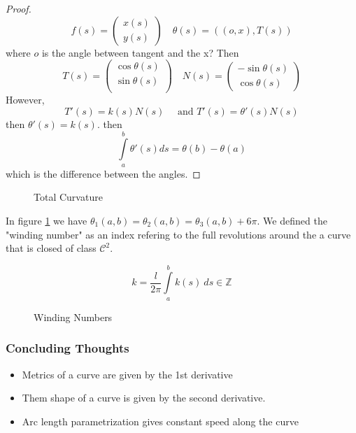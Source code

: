 \begin{proof}
    \[
        f(s) = \begin{pmatrix*}
            x(s)  \\
            y(s)  
        \end{pmatrix*}
        \quad \theta (s) = \left( (o,x) , T(s) \right) 
    \]
    where $ o  $ is the angle between tangent and the x? 
    Then 
    \[
        T(s) = \begin{pmatrix*}
            \cos \theta (s)   \\
            \sin \theta (s)   \\
        \end{pmatrix*}
        \quad 
        N(s) = 
        \begin{pmatrix*}
            -\sin \theta (s)  \\
            \cos \theta (s)   
        \end{pmatrix*}
        
    \]
    However, 
    \[
        T'(s) = k(s) N(s) \quad \text{ and } T'(s) = \theta '(s) N(s) 
    \]
    then 
    $ \theta '(s) = k(s)  $. 
    then 
    \[
        \int\limits_{a}^{b} \theta '(s) ds = \theta(b) - \theta(a) 
    \]
    which is the difference between the angles. 
\end{proof}

\begin{figure}[ht]
    \centering
    \caption{Total Curvature}
    \label{fig:total-curvature}
\end{figure}

In figure \ref{fig:total-curvature} we have $ \theta_1\left( a,b\right) = \theta_2\left(
a,b\right) = \theta_3\left( a,b\right) + 6\pi $. We defined the "winding number" as an
index refering to the full revolutions around the a curve that is closed of class $
\mathscr{ C } ^2 $.  

\[
    k = \frac{ l }{ 2\pi  } \int\limits_{a}^{b} k(s) \ ds \in \mathbb{Z}
\]


\begin{figure}[ht]
    \centering
    \caption{Winding Numbers}
    \label{fig:winding-numbers}
\end{figure}

\subsubsection{Concluding Thoughts}
\begin{itemize}
  \item Metrics of a curve are given by the 1st derivative
  \item Them shape of a curve is given by the second derivative. 
  \item Arc length parametrization gives constant speed along the curve 
\end{itemize}






